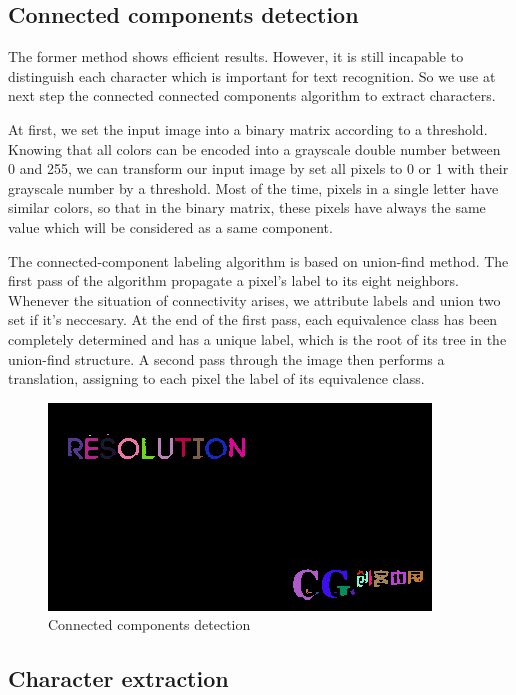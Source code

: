 \documentclass[paper=a4, french, 11pt]{scrartcl}
\begin{document}
\subsection{Connected components detection}
The former method shows efficient results. However, it is still incapable to distinguish each character which is important for text recognition. So we use at next step the connected connected components algorithm to extract characters.

At first, we set the input image into a binary matrix according to a threshold. Knowing that all colors can be encoded into a grayscale double number between 0 and 255, we can transform our input image by set all pixels to 0 or 1 with their grayscale number by a threshold. Most of the time, pixels in a single letter have similar colors, so that in the binary matrix, these pixels have always the same value which will be considered as a same component.

The connected-component labeling algorithm is based on union-find method. The first pass of the algorithm propagate a pixel's label to its eight neighbors. Whenever the situation of connectivity arises, we attribute labels and union two set if it's neccesary. At the end of the first pass, each equivalence class has been completely determined and has a unique label, which is the root of its tree in the union-find structure. A second pass through the image then performs a translation, assigning to each pixel the label of its equivalence class.

\begin{figure}[h]
\begin{center}
   \includegraphics[width=0.75\linewidth]{connected_components_example.png}
\end{center}
\vspace{-4ex}
\caption{Connected components detection}
\label{fig:heatmap}
\end{figure}

\subsection{Character extraction}
\end{document}
